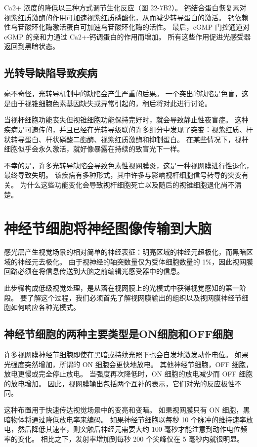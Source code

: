 Ca2+ 浓度的降低以三种方式调节生化反应（图 22-7B2）。 钙结合蛋白恢复素对视紫红质激酶的作用可加速视紫红质磷酸化，从而减少转导蛋白的激活。 钙依赖性鸟苷酸环化酶激活蛋白可加速鸟苷酸环化酶的活性。 最后，cGMP 门控通道对 cGMP 的亲和力通过 Ca2+-钙调蛋白的作用而增加。 所有这些作用促进光感受器返回到黑暗状态。

\subsection{光转导缺陷导致疾病}
毫不奇怪，光转导机制中的缺陷会产生严重的后果。 一个突出的缺陷是色盲，这是由于视锥细胞色素基因缺失或异常引起的，稍后将对此进行讨论。

当视杆细胞功能丧失但视锥细胞功能保持完好时，就会导致静止性夜盲症。 这种疾病是可遗传的，并且已经在光转导级联的许多组分中发现了突变：视紫红质、杆状转导蛋白、杆状磷酸二酯酶、视紫红质激酶和抑制蛋白。 在某些情况下，视杆细胞似乎会永久激活，就好像暴露在持续的致盲光下一样。

不幸的是，许多光转导缺陷会导致色素性视网膜炎，这是一种视网膜进行性退化，最终导致失明。 该疾病有多种形式，其中许多与影响视杆细胞信号转导的突变有关。 为什么这些功能变化会导致视杆细胞死亡以及随后的视锥细胞退化尚不清楚。


\section{神经节细胞将神经图像传输到大脑}
感光层产生视觉场景的相对简单的神经表征：明亮区域的神经元超极化，而黑暗区域的神经元去极化。 由于视神经的轴突数量仅为受体细胞数量的 1\%，因此视网膜回路必须在将信息传送到大脑之前编辑光感受器中的信息。

此步骤构成低级视觉处理，是从落在视网膜上的光模式中获得视觉感知的第一阶段。 要了解这个过程，我们必须首先了解视网膜输出的组织以及视网膜神经节细胞如何响应各种光模式。


\subsection{神经节细胞的两种主要类型是ON细胞和OFF细胞}
许多视网膜神经节细胞即使在黑暗或持续光照下也会自发地激发动作电位。 如果光强度突然增加，所谓的 ON 细胞会更快地放电。 其他神经节细胞，OFF 细胞，放电更慢或完全停止放电。 当强度再次降低时，ON 细胞的放电减少而 OFF 细胞的放电增加。 因此，视网膜输出包括两个互补的表示，它们对光的反应极性不同。

这种布置用于快速传达视觉场景中的变亮和变暗。 如果视网膜只有 ON 细胞，黑暗物体将通过降低放电率来编码。 如果神经节细胞以每秒 10 个脉冲的维持速率放电，然后降低其速率，则突触后神经元需要大约 100 毫秒才能注意到动作电位频率的变化。 相比之下，发射率增加到每秒 200 个尖峰仅在 5 毫秒内就很明显。

